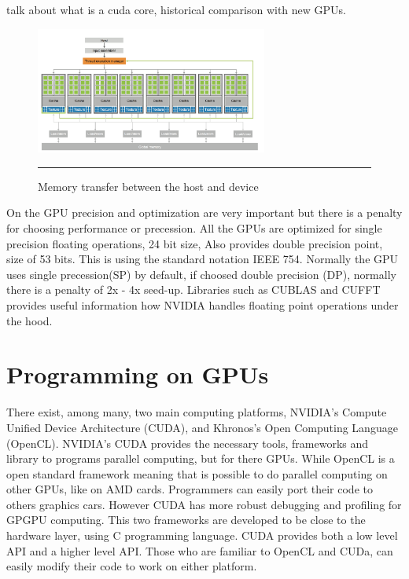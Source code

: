 talk about what is a cuda core, historical comparison with new GPUs.

\begin{figure}[htbp]
	\centering
		\includegraphics[width=0.68\textwidth]{Figures/arch.png}
		\rule{35em}{0.5pt}
	\caption[Host and Device]{Memory transfer between the host and device}
	\label{fig:arch}
\end{figure}



On the GPU precision and optimization are very important but there is a penalty for choosing performance or precession. All the GPUs are optimized for single precision floating operations, 24 bit size, Also provides double precision point, size of  53 bits. This is using the standard notation IEEE 754. Normally the GPU uses single precession(SP) by default, if choosed double precision (DP), normally there is a penalty of  2x - 4x seed-up. \cite{precision}
Libraries such as CUBLAS and CUFFT provides useful information how NVIDIA handles floating point operations under the hood.


\section{Programming on GPUs}

There exist, among many, two main computing platforms, NVIDIA's Compute Unified Device Architecture (CUDA), and Khronos's Open Computing Language (OpenCL). NVIDIA's CUDA provides the necessary tools, frameworks and library to programs parallel computing, but for there GPUs. While OpenCL is a open standard framework meaning that is possible to do parallel computing on other GPUs, like on AMD cards. Programmers can easily port their code to others graphics cars.  However CUDA has more robust debugging and profiling for GPGPU computing. This two frameworks are developed to be close to the hardware layer, using C programming language. CUDA provides both a low level API and a higher level API. Those who are familiar to OpenCL and CUDa, can easily modify their code to work on either platform.\cite{hwu}

